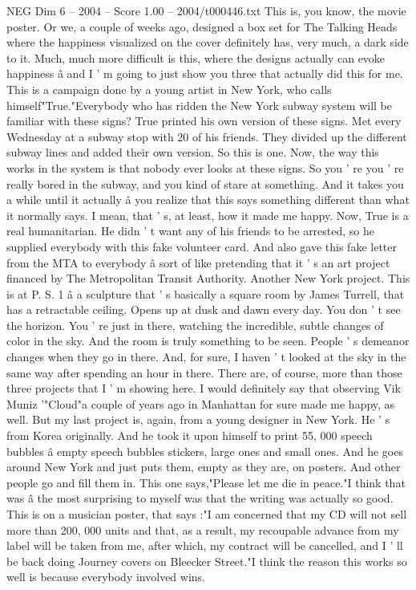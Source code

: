 \begin{textsample}{NEG Dim 6 – 2004 – Score 1.00 – 2004/t000446.txt}
This is, you know, the movie poster.
Or we, a couple of weeks ago, designed a box set for The Talking Heads where the happiness visualized on the cover definitely has, very much, a dark side to it.
Much, much more difficult is this, where the designs actually can evoke happiness â and I ' m going to just show you three that actually did this for me.
This is a campaign done by a young artist in New York, who calls himself"True."Everybody who has ridden the New York subway system will be familiar with these signs?
True printed his own version of these signs.
Met every Wednesday at a subway stop with 20 of his friends.
They divided up the different subway lines and added their own version.
So this is one.
Now, the way this works in the system is that nobody ever looks at these signs.
So you ' re you ' re really bored in the subway, and you kind of stare at something.
And it takes you a while until it actually â you realize that this says something different than what it normally says.
I mean, that ' s, at least, how it made me happy.
Now, True is a real humanitarian.
He didn ' t want any of his friends to be arrested, so he supplied everybody with this fake volunteer card.
And also gave this fake letter from the MTA to everybody â sort of like pretending that it ' s an art project financed by The Metropolitan Transit Authority.
Another New York project.
This is at P.
S. 1 â a sculpture that ' s basically a square room by James Turrell, that has a retractable ceiling.
Opens up at dusk and dawn every day.
You don ' t see the horizon.
You ' re just in there, watching the incredible, subtle changes of color in the sky.
And the room is truly something to be seen.
People ' s demeanor changes when they go in there.
And, for sure, I haven ' t looked at the sky in the same way after spending an hour in there.
There are, of course, more than those three projects that I ' m showing here.
I would definitely say that observing Vik Muniz '"Cloud"a couple of years ago in Manhattan for sure made me happy, as well.
But my last project is, again, from a young designer in New York.
He ' s from Korea originally.
And he took it upon himself to print 55, 000 speech bubbles â empty speech bubbles stickers, large ones and small ones.
And he goes around New York and just puts them, empty as they are, on posters.
And other people go and fill them in.
This one says,"Please let me die in peace."I think that was â the most surprising to myself was that the writing was actually so good.
This is on a musician poster, that says :"I am concerned that my CD will not sell more than 200, 000 units and that, as a result, my recoupable advance from my label will be taken from me, after which, my contract will be cancelled, and I ' ll be back doing Journey covers on Bleecker Street."I think the reason this works so well is because everybody involved wins.

\end{textsample}
